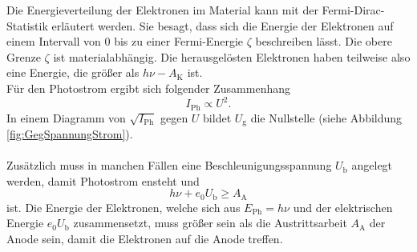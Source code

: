     Die Energieverteilung der Elektronen im Material kann mit der Fermi-Dirac-Statistik erläutert werden.
    Sie besagt, dass sich die Energie der Elektronen auf einem Intervall von 0 bis zu einer Fermi-Energie $\zeta$ beschreiben lässt.
    Die obere Grenze $\zeta$ ist materialabhängig.
    Die herausgelösten Elektronen haben teilweise also eine Energie, die größer als $h \nu - A_\text{K}$ ist.\\
    Für den Photostrom ergibt sich folgender Zusammenhang
    \begin{equation}
        I_\text{Ph} \propto U^2 .
    \end{equation}
    In einem Diagramm von $\sqrt{I_\text{Ph}}$ gegen $U$ bildet $U_\text{g}$ die Nullstelle (siehe Abbildung \ref{fig:GegSpannungStrom}).\\
    \\
    Zusätzlich muss in manchen Fällen eine Beschleunigungsspannung $U_\text{b}$ angelegt werden,
    damit Photostrom ensteht und
    \begin{equation}
        h \nu + e_0 U_\text{b} \geq A_\text{A}
    \end{equation}
    ist.
    Die Energie der Elektronen, welche sich aus $E_\text{Ph} =  h \nu$ und der elektrischen Energie $e_0 U_\text{b}$ zusammensetzt,
    muss größer sein als die Austrittsarbeit $A_\text{A}$ der Anode sein,
    damit die Elektronen auf die Anode treffen.
